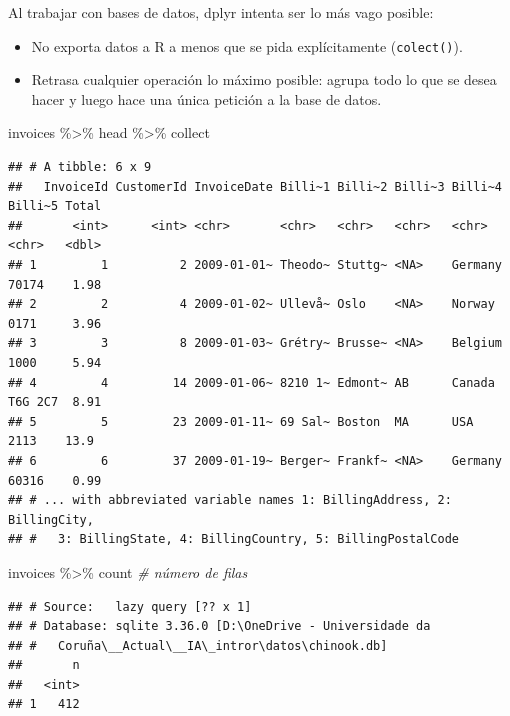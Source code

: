 \documentclass[
]{book}
\newenvironment{Shaded}{\begin{snugshade}}{\end{snugshade}}
\newcommand{\CommentTok}[1]{\textcolor[rgb]{0.56,0.35,0.01}{\textit{#1}}}
\newcommand{\NormalTok}[1]{#1}
\newcommand{\SpecialCharTok}[1]{\textcolor[rgb]{0.00,0.00,0.00}{#1}}
\theoremstyle{break}
\theoremstyle{nonumberplain}
\begin{document}
Al trabajar con bases de datos, dplyr intenta ser lo más vago posible:

\begin{itemize}
\item
  No exporta datos a R a menos que se pida explícitamente (\texttt{colect()}).
\item
  Retrasa cualquier operación lo máximo posible:
  agrupa todo lo que se desea hacer y luego hace una única petición a la base de datos.
\end{itemize}

\begin{Shaded}
\begin{Highlighting}[]
\NormalTok{invoices }\SpecialCharTok{\%\textgreater{}\%}\NormalTok{ head }\SpecialCharTok{\%\textgreater{}\%}\NormalTok{ collect}
\end{Highlighting}
\end{Shaded}

\begin{verbatim}
## # A tibble: 6 x 9
##   InvoiceId CustomerId InvoiceDate Billi~1 Billi~2 Billi~3 Billi~4 Billi~5 Total
##       <int>      <int> <chr>       <chr>   <chr>   <chr>   <chr>   <chr>   <dbl>
## 1         1          2 2009-01-01~ Theodo~ Stuttg~ <NA>    Germany 70174    1.98
## 2         2          4 2009-01-02~ Ullevå~ Oslo    <NA>    Norway  0171     3.96
## 3         3          8 2009-01-03~ Grétry~ Brusse~ <NA>    Belgium 1000     5.94
## 4         4         14 2009-01-06~ 8210 1~ Edmont~ AB      Canada  T6G 2C7  8.91
## 5         5         23 2009-01-11~ 69 Sal~ Boston  MA      USA     2113    13.9 
## 6         6         37 2009-01-19~ Berger~ Frankf~ <NA>    Germany 60316    0.99
## # ... with abbreviated variable names 1: BillingAddress, 2: BillingCity,
## #   3: BillingState, 4: BillingCountry, 5: BillingPostalCode
\end{verbatim}

\begin{Shaded}
\begin{Highlighting}[]
\NormalTok{invoices }\SpecialCharTok{\%\textgreater{}\%}\NormalTok{ count }\CommentTok{\# número de filas}
\end{Highlighting}
\end{Shaded}

\begin{verbatim}
## # Source:   lazy query [?? x 1]
## # Database: sqlite 3.36.0 [D:\OneDrive - Universidade da
## #   Coruña\__Actual\__IA\_intror\datos\chinook.db]
##       n
##   <int>
## 1   412
\end{verbatim}
\end{document}
